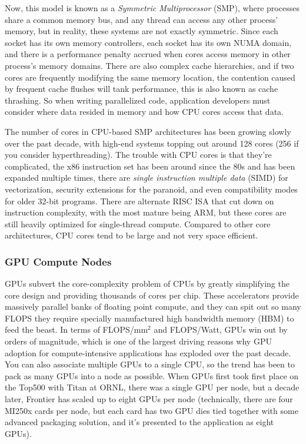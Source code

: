 Now, this model is known as a \textit{Symmetric Multiprocessor} (SMP), where processes share a common memory bus, and any thread can access any other process' memory, but in reality, these systems are not exactly symmetric. 
Since each socket has its own memory controllers, each socket has its own NUMA domain, and there is a performance penalty accrued when cores access memory in other process's memory domains.
There are also complex cache hierarchies, and if two cores are frequently modifying the same memory location, the contention caused by frequent cache flushes will tank performance, this is also known as cache thrashing.
So when writing parallelized code, application developers must consider where data resided in memory and how CPU cores access that data.
 
The number of cores in CPU-based SMP architectures has been growing slowly over the past decade, with high-end systems topping out around 128 cores (256 if you consider hyperthreading).
The trouble with CPU cores is that they're complicated, the x86 instruction set has been around since the 80s and has been expanded multiple times, there are \textit{single instruction multiple data} (SIMD) for vectorization, security extensions for the paranoid, and even compatibility modes for older 32-bit programs. 
There are alternate RISC ISA that cut down on instruction complexity, with the most mature being ARM, but these cores are still heavily optimized for single-thread compute.
Compared to other core architectures, CPU cores tend to be large and not very space efficient. 

\subsubsection{GPU Compute Nodes}
GPUs subvert the core-complexity problem of CPUs by greatly simplifying the core design and providing thousands of cores per chip. 
These accelerators provide massively parallel banks of floating point compute, and they can spit out so many FLOPS they require specially manufactured high bandwidth memory (HBM) to feed the beast.
In terms of FLOPS/mm$^2$ and FLOPS/Watt, GPUs win out by orders of magnitude, which is one of the largest driving reasons why GPU adoption for compute-intensive applications has exploded over the past decade.
You can also associate multiple GPUs to a single CPU, so the trend has been to pack as many GPUs into a node as possible.
When GPUs first took first place on the Top500 with Titan at ORNL, there was a single GPU per node, but a decade later, Frontier has scaled up to eight GPUs per node (technically, there are four MI250x cards per node, but each card has two GPU dies tied together with some advanced packaging solution, and it's presented to the application as eight GPUs).

